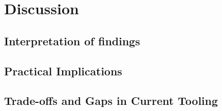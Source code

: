 \section{Discussion}
\subsection{Interpretation of findings}

\subsection{Practical Implications}

\subsection{Trade-offs and Gaps in Current Tooling}
